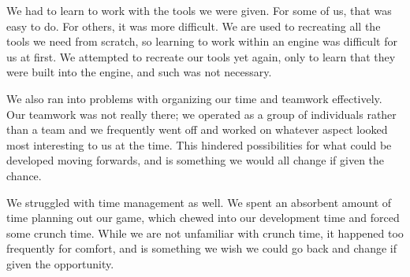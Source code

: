 \documentclass{sigchi}
\begin{document}
We had to learn to work with the tools we were given.  For some of us, that was easy to do.  For others, it was more difficult.  We are used to recreating all the tools we need from scratch, so learning to work within an engine was difficult for us at first.  We attempted to recreate our tools yet again, only to learn that they were built into the engine, and such was not necessary.

We also ran into problems with organizing our time and teamwork effectively.  Our teamwork was not really there; we operated as a group of individuals rather than a team and we frequently went off and worked on whatever aspect looked most interesting to us at the time.  This hindered possibilities for what could be developed moving forwards, and is something we would all change if given the chance.

We struggled with time management as well.  We spent an absorbent amount of time planning out our game, which chewed into our development time and forced some crunch time.  While we are not unfamiliar with crunch time, it happened too frequently for comfort, and is something we wish we could go back and change if given the opportunity.  



\end{document}
